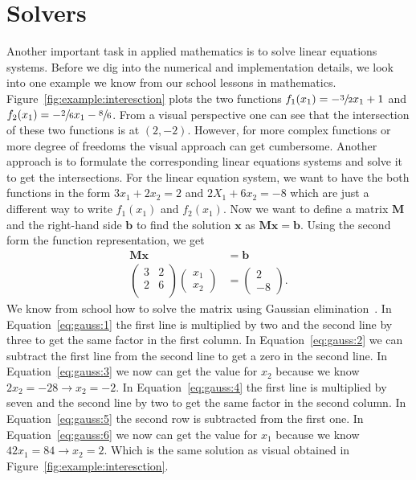 \chapter{Solvers}
Another important task in applied mathematics is to solve linear equations systems. Before we dig into the numerical and implementation details, we look into one example we know from our school lessons in mathematics. Figure~\ref{fig:example:interesction} plots the two functions $f_1(x_1)=-\sfrac{3}{2}x_1+1$ and  $f_2(x_1)=-\sfrac{2}{6}x_1-\sfrac{8}{6}$. From a visual perspective one can see that the intersection of these two functions is at $(2,-2)$. However, for more complex functions or more degree of freedoms the visual approach can get cumbersome. Another approach is to formulate the corresponding linear equations systems and solve it to get the intersections. For the linear equation system, we want to have the both functions in the form $3x_1+2x_2=2$ and $2X_1+6x_2=-8$ which are just a different way to write $f_1(x_1)$ and $f_2(x_1)$. Now we want to define a matrix $\mathbf{M}$ and the right-hand side $\mathbf{b}$ to find the solution $\mathbf{x}$ as $\mathbf{M}\mathbf{x}=\mathbf{b}$. Using the second form the function representation, we get 
\begin{align}
\mathbf{M}\mathbf{x}&=\mathbf{b} \\
\left(\begin{matrix}
3 & 2 \\
2 & 6 \\
\end{matrix}\right)
\left(\begin{matrix}
x_1 \\
x_2
\end{matrix}\right)
&=\left(
\begin{matrix}
2 \\
-8
\end{matrix}\right)\text{.}
\end{align}
We know from school how to solve the matrix using Gaussian elimination~\cite{brown1999contextual}. In Equation~\eqref{eq:gauss:1} the first line is multiplied by two and the second line by three to get the same factor in the first column. In Equation~\eqref{eq:gauss:2} we can subtract the first line from the second line to get a zero in the second line. In Equation~\eqref{eq:gauss:3} we now can get the value for $x_2$ because we know $2x_2=-28\rightarrow x_2=-2$. In Equation~\eqref{eq:gauss:4} the first line is multiplied by seven and the second line by two to get the same factor in the second column. In Equation~\eqref{eq:gauss:5} the second row is subtracted from the first one. In Equation~\eqref{eq:gauss:6} we now can get the value for $x_1$ because we know $42x_1=84\rightarrow x_2=2$. Which is the same solution as visual obtained in Figure~\ref{fig:example:interesction}.\\

